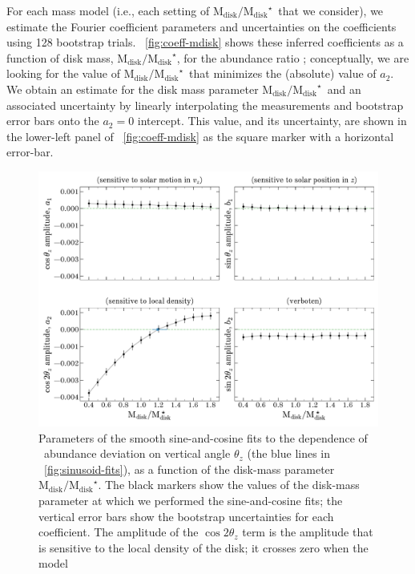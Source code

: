 \documentclass[modern]{aastex63}
\newcommand{\mdisk}{\ensuremath{\mathrm{M}_\mathrm{disk}}}
\newcommand{\mratio}{\ensuremath{\mdisk / \mdisk^\star}}
\begin{document}
For each mass model (i.e., each setting of \mratio\ that we consider), we
estimate the Fourier coefficient parameters and uncertainties on the
coefficients using 128 bootstrap trials.
\figurename~\ref{fig:coeff-mdisk} shows these inferred coefficients as a
function of disk mass, \mratio, for the abundance ratio \mgfe; conceptually, we
are looking for the value of \mratio\ that minimizes the (absolute) value of
$a_2$.
We obtain an estimate for the disk mass parameter \mratio\ and an associated
uncertainty by linearly interpolating the measurements and bootstrap error bars
onto the $a_2=0$ intercept.
This value, and its uncertainty, are shown in the lower-left panel of
\figurename~\ref{fig:coeff-mdisk} as the square marker with a horizontal
error-bar.

\begin{figure}[!tp] %
  \begin{center}
  \includegraphics[width=\textwidth]{coeff-vs-mdisk.pdf}
  \end{center}
  \caption{%
    Parameters of the smooth sine-and-cosine fits to the dependence of \mgfe\
    abundance deviation on vertical angle $\theta_z$ (the blue lines in
    \figurename~\ref{fig:sinusoid-fits}), as a function of the disk-mass
    parameter \mratio.
    The black markers show the values of the disk-mass parameter at which we
    performed the sine-and-cosine fits; the vertical error bars show the
    bootstrap uncertainties for each coefficient.
    The amplitude of the $\cos 2\theta_z$ term is the amplitude that is
    sensitive to the local density of the disk; it crosses zero when the model
}
\end{figure}
\end{document}
